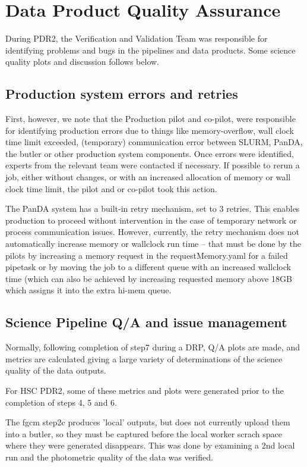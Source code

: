 \section{Data Product Quality Assurance} \label{sec:qa}

During PDR2, the Verification and Validation Team was responsible 
for identifying problems and bugs in the pipelines and data products. 
Some science quality plots and discussion follows below.

\subsection{Production system errors and retries}

First, however, we note that the Production pilot and co-pilot, 
were responsible for identifying production errors due to things 
like memory-overflow, wall clock time limit exceeded, 
(temporary) communication error between SLURM, PanDA, the butler or other 
production system components.  Once errors were
identified, experts from the relevant team were contacted if necessary.
If possible to rerun a job, either without changes, or with an
increased allocation of memory or wall clock time limit, the pilot and
or co-pilot took this action.

The PanDA system has a built-in retry mechanism, set to 3 retries.  This
enables production to proceed without intervention in the case of
temporary network or process communication issues. However,
currently, the retry mechanism does not automatically increase memory
or wallclock run time -- that must be done by the pilots by increasing
a memory request in the requestMemory.yaml for a failed pipetask or
by moving the job to a different queue with an increased wallclock time
(which can also be achieved by increasing requested memory above 18GB which
assigns it into the extra hi-mem queue.

\subsection{Science Pipeline Q/A and issue management}

Normally, following completion of step7 during a DRP, Q/A plots are made,
and metrics are calculated giving a large variety of determinations of
the science quality of the data outputs.

For HSC PDR2, some of these metrics and plots were generated prior to 
the completion of steps 4, 5 and 6.

The fgcm step2c produces 'local' outputs, but does not currently upload them 
into a butler, so they must be captured before the local worker scrach space where they were
generated disappears.
This was done by examining a 2nd local run and the photometric quality of the
data was verified.
 
